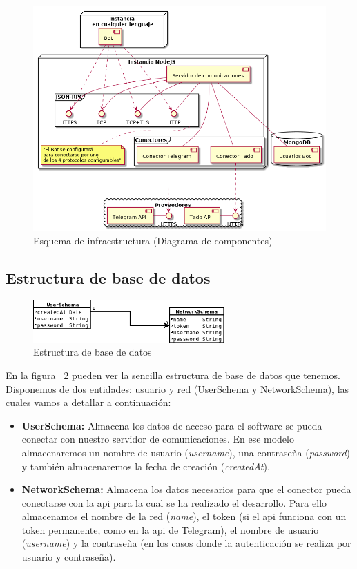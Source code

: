 \documentclass[spanish,12pt, a4paper, twoside]{paper}
\begin{document}
\begin{figure}[h]
\centering
	\includegraphics[width=\textwidth]{recursos/component}
\caption{Esquema de infraestructura (Diagrama de componentes)}
\label{fig:Infraestructura de nodos}
\end{figure}

\newpage

\subsection{Estructura de base de datos}

\begin{figure}[h]
\centering
	\includegraphics[width=0.65\textwidth]{recursos/schemes}
\caption{Estructura de base de datos}
\label{fig:Estructura de base de datos}
\end{figure}

En la figura ~\ref{fig:Estructura de base de datos} pueden ver la sencilla estructura de base de datos que tenemos. Disponemos de dos entidades: usuario y red (UserSchema y NetworkSchema), las cuales vamos a detallar a continuación:

\begin{itemize}
\item\textbf{UserSchema:} Almacena los datos de acceso para el software se pueda conectar con nuestro servidor de comunicaciones. En ese modelo almacenaremos un nombre de usuario (\emph{username}), una contraseña (\emph{password}) y también almacenaremos la fecha de creación (\emph{createdAt}).

\item\textbf{NetworkSchema:} Almacena los datos necesarios para que el conector pueda conectarse con la api para la cual se ha realizado el desarrollo. Para ello almacenamos el nombre de la red (\emph{name}), el token (si el api funciona con un token permanente, como en la api de Telegram), el nombre de usuario (\emph{username}) y la contraseña (en los casos donde la autenticación se realiza por usuario y contraseña).
\end{itemize}
\end{document}
